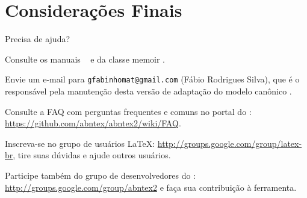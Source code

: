 \chapter{Considerações Finais}

Precisa de ajuda?

Consulte os manuais \abnTeX\ \cite{abntex2classe,abntex2cite,abntex2cite-alf} e da classe \textsf{memoir} \cite{memoir}.

Envie um e-mail para \texttt{gfabinhomat@gmail.com} (Fábio Rodrigues Silva), que é o responsável pela manutenção desta versão de adaptação do modelo canônico \abnTeX.

Consulte a FAQ com perguntas frequentes e comuns no portal do \abnTeX:
\url{https://github.com/abntex/abntex2/wiki/FAQ}.

Inscreva-se no grupo de usuários \LaTeX: \url{http://groups.google.com/group/latex-br}, tire suas dúvidas e ajude outros usuários.

Participe também do grupo de desenvolvedores do \abnTeX: \url{http://groups.google.com/group/abntex2} e faça sua contribuição à ferramenta.